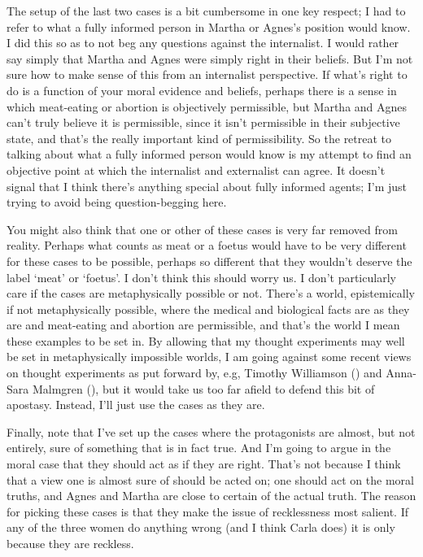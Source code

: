 \documentclass[
  11pt,
  letterpaper,
  DIV=11,
  numbers=noendperiod,
  twoside]{scrartcl}
\begin{document}
The setup of the last two cases is a bit cumbersome in one key respect;
I had to refer to what a fully informed person in Martha or Agnes's
position would know. I did this so as to not beg any questions against
the internalist. I would rather say simply that Martha and Agnes were
simply right in their beliefs. But I'm not sure how to make sense of
this from an internalist perspective. If what's right to do is a
function of your moral evidence and beliefs, perhaps there is a sense in
which meat-eating or abortion is objectively permissible, but Martha and
Agnes can't truly believe it is permissible, since it isn't permissible
in their subjective state, and that's the really important kind of
permissibility. So the retreat to talking about what a fully informed
person would know is my attempt to find an objective point at which the
internalist and externalist can agree. It doesn't signal that I think
there's anything special about fully informed agents; I'm just trying to
avoid being question-begging here.

You might also think that one or other of these cases is very far
removed from reality. Perhaps what counts as meat or a foetus would have
to be very different for these cases to be possible, perhaps so
different that they wouldn't deserve the label `meat' or `foetus'. I
don't think this should worry us. I don't particularly care if the cases
are metaphysically possible or not. There's a world, epistemically if
not metaphysically possible, where the medical and biological facts are
as they are and meat-eating and abortion are permissible, and that's the
world I mean these examples to be set in. By allowing that my thought
experiments may well be set in metaphysically impossible worlds, I am
going against some recent views on thought experiments as put forward
by, e.g, Timothy Williamson
() and Anna-Sara Malmgren
(), but it would take us too far afield
to defend this bit of apostasy. Instead, I'll just use the cases as they
are.

Finally, note that I've set up the cases where the protagonists are
almost, but not entirely, sure of something that is in fact true. And
I'm going to argue in the moral case that they should act as if they are
right. That's not because I think that a view one is almost sure of
should be acted on; one should act on the moral truths, and Agnes and
Martha are close to certain of the actual truth. The reason for picking
these cases is that they make the issue of recklessness most salient. If
any of the three women do anything wrong (and I think Carla does) it is
only because they are reckless.
\end{document}
